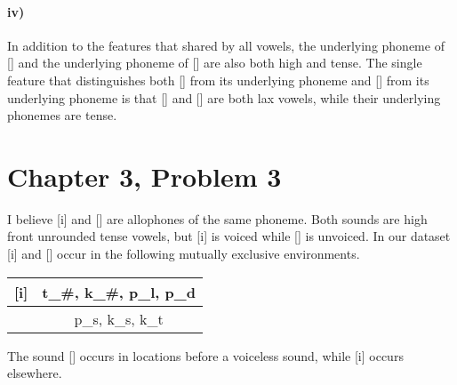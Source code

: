 \documentclass[12pt]{article}
\begin{document}
\begin{center}
\end{center}

\paragraph{iv)}

In addition to the features that shared by all vowels, the underlying phoneme of [\textsci] and the underlying phoneme of [\textepsilon] are also
both high and tense. The single feature that distinguishes both [\textsci] from its underlying phoneme and [\textupsilon] from its underlying
phoneme is that [\textsci] and [\textupsilon] are both lax vowels, while their underlying phonemes are tense.

\section*{Chapter 3, Problem 3}

I believe [i] and [] are allophones of the same phoneme. Both sounds are high front unrounded tense vowels, but [i]
is voiced while [] is unvoiced. In our dataset [i] and [] occur in the following mutually exclusive environments.
\begin{center}
    \begin{tabular}{c|c}
        [i] & t\_\#, k\_\#, p\_l, p\_d\\
        \hline
        [\textsubring{i}] & p\_s, k\_s, k\_t
    \end{tabular}
\end{center}
The sound [] occurs in locations before a voiceless sound, while [i] occurs elsewhere.
\begin{center}
\end{center}
\end{document}
